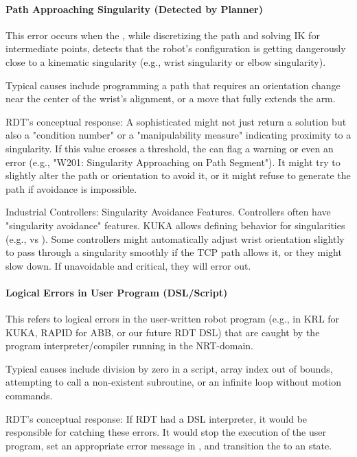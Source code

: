 \paragraph{Path Approaching Singularity (Detected by Planner)}
This error occurs when the , while discretizing the path and solving IK for intermediate points, detects that the robot's configuration is getting dangerously close to a kinematic singularity (e.g., wrist singularity or elbow singularity).

Typical causes include programming a path that requires an orientation change near the center of the wrist's alignment, or a move that fully extends the arm.

RDT's conceptual response: A sophisticated  might not just return a solution but also a "condition number" or a "manipulability measure" indicating proximity to a singularity. If this value crosses a threshold, the  can flag a warning or even an error (e.g., "W201: Singularity Approaching on Path Segment"). It might try to slightly alter the path or orientation to avoid it, or it might refuse to generate the path if avoidance is impossible.

\begin{principlebox}{Industrial Controllers: Singularity Avoidance Features.}
    Controllers often have "singularity avoidance" features. KUKA allows defining behavior for singularities (e.g.,  vs ). Some controllers might automatically adjust wrist orientation slightly to pass through a singularity smoothly if the TCP path allows it, or they might slow down. If unavoidable and critical, they will error out.
\end{principlebox}

\paragraph{Logical Errors in User Program (DSL/Script)}
This refers to logical errors in the user-written robot program (e.g., in KRL for KUKA, RAPID for ABB, or our future RDT DSL) that are caught by the program interpreter/compiler running in the NRT-domain.

Typical causes include division by zero in a script, array index out of bounds, attempting to call a non-existent subroutine, or an infinite loop without motion commands.

RDT's conceptual response: If RDT had a DSL interpreter, it would be responsible for catching these errors. It would stop the execution of the user program, set an appropriate error message in , and transition the  to an  state.

